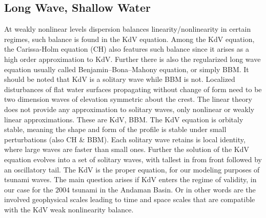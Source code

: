 \subsection{Long Wave, Shallow Water}
At weakly nonlinear levels dispersion balances linearity/nonlinearity in
certain regimes, such balance is found in the KdV equation. Among the KdV
equation, the Carissa-Holm equation (CH) also features such balance since it
arises as a high order approximation to KdV. Further there is also the
regularized long wave equation usually called Benjamin–Bona–Mahony equation, or simply
BBM. It should be noted that KdV is a solitary wave while BBM is not.
Localized disturbances of flat water surfaces propagating without change of
form need to be two dimension waves of elevation symmetric about the crest.
The linear theory does not provide any approximation to solitary waves, only
nonlinear or weakly linear approximations. These are KdV, BBM. The KdV
equation is orbitaly stable, meaning the shape and form of the profile is
stable under small perturbations (also CH \& BBM). Each solitary wave retains
is local identity, where large waves are faster than small ones. Further the
solution of the KdV equation evolves into a set of solitary waves, with
tallest in from front followed by an oscillatory tail. The KdV is the
proper equation, for our modeling purposes of tsunami waves. The main
question arises if KdV enters the regime of validity, in our case for the
$2004$ tsunami in the Andaman Basin. Or in other words are the involved
geophysical scales leading to time and space scales that are compatible with
the KdV weak nonlinearity balance.
